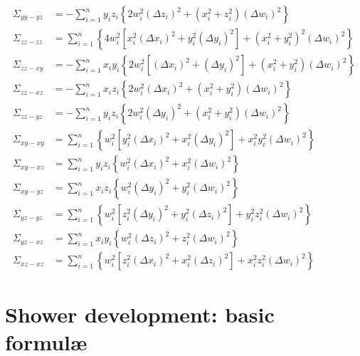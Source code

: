 \documentclass[a4paper,11pt]{article}
\begin{document}
\begin{align}
  \Sigma_{yy-yz} &= -\sum_{i=1}^n y_iz_i \left\{
  2w_i^2 (\Delta z_i)^2 + (x_i^2 + z_i^2)(\Delta w_i)^2
  \right\}\\
  \Sigma_{zz-zz} &= \sum_{i=1}^n \left\{
  4w_i^2 \left[ x_i^2(\Delta x_i)^2 + y_i^2(\Delta y_i)^2 \right] +
  \left(x_i^2 + y_i^2\right)^2(\Delta w_i)^2
  \right\}\\
  \Sigma_{zz-xy} &= -\sum_{i=1}^n x_iy_i \left\{
  2w_i^2 \left[ (\Delta x_i)^2 + (\Delta y_i)^2 \right] +
  (x_i^2 + y_i^2)(\Delta w_i)^2
  \right\}\\
  \Sigma_{zz-xz} &= -\sum_{i=1}^n x_iz_i \left\{
  2w_i^2 (\Delta x_i)^2 + (x_i^2 + y_i^2)(\Delta w_i)^2
  \right\}\\
  \Sigma_{zz-yz} &= -\sum_{i=1}^n y_iz_i \left\{
  2w_i^2 (\Delta y_i)^2 + (x_i^2 + y_i^2)(\Delta w_i)^2
  \right\}\\
  \Sigma_{xy-xy} &= \sum_{i=1}^n \left\{
  w_i^2 \left[ y_i^2 (\Delta x_i)^2 + x_i^2 (\Delta y_i)^2 \right] +
  x_i^2y_i^2 (\Delta w_i)^2
  \right\}\\
  \Sigma_{xy-xz} &= \sum_{i=1}^n y_iz_i \left\{
  w_i^2 (\Delta x_i)^2 + x_i^2 (\Delta w_i)^2
  \right\}\\
  \Sigma_{xy-yz} &= \sum_{i=1}^n x_iz_i \left\{
  w_i^2 (\Delta y_i)^2 + y_i^2 (\Delta w_i)^2
  \right\}\\
  \Sigma_{yz-yz} &= \sum_{i=1}^n \left\{
  w_i^2 \left[ z_i^2 (\Delta y_i)^2 + y_i^2 (\Delta z_i)^2 \right] +
  y_i^2z_i^2 (\Delta w_i)^2
  \right\}\\
  \Sigma_{yz-xz} &= \sum_{i=1}^n x_iy_i \left\{
  w_i^2 (\Delta z_i)^2 + z_i^2 (\Delta w_i)^2
  \right\}\\
  \Sigma_{xz-xz} &= \sum_{i=1}^n \left\{
  w_i^2 \left[ z_i^2 (\Delta x_i)^2 + x_i^2 (\Delta z_i)^2 \right] +
  x_i^2z_i^2 (\Delta w_i)^2
  \right\}
\end{align}



\section{Shower development: basic formul\ae}
\end{document}
